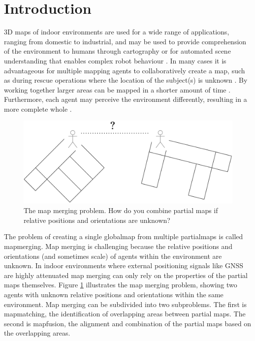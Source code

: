 
\section{Introduction}

3D \gls{map}s of indoor environments are used for a wide range of applications, ranging from domestic to industrial, and may be used to provide comprehension of the environment to humans through cartography or for automated scene understanding that enables complex robot behaviour \citep{chen_indoor_2020,wang_safe_2019,hermann_design_2016}. In many cases it is advantageous for multiple mapping agents to collaboratively create a map, such as during rescue operations where the location of the subject(s) is unknown \citep{queralta_collaborative_2020}. By working together larger areas can be mapped in a shorter amount of time \citep{lajoie_towards_2022}. Furthermore, each agent may perceive the environment differently, resulting in a more complete whole \citep{schuster_arches_2020}.

\begin{figure}[h]
    \centering
    \includegraphics*[width=.7\textwidth]{./fig/overview_diagrams-Page-4.drawio.pdf}
    \caption{The map merging problem. How do you combine partial maps if relative positions and orientations are unknown?}
    \label{fig:map_merging}
\end{figure}

The problem of creating a single \gls{globalmap} from multiple \gls{partialmap}s is called \gls{mapmerging}. Map merging is challenging because the relative positions and orientations (and sometimes scale) of agents within the environment are unknown. In indoor environments where external positioning signals like GNSS are highly attenuated map merging can only rely on the properties of the partial maps themselves. Figure \ref{fig:map_merging} illustrates the map merging problem, showing two agents with unknown relative positions and orientations within the same environment. Map merging can be subdivided into two subproblems. The first is \gls{mapmatching}, the identification of overlapping areas between partial maps. The second is \gls{mapfusion}, the alignment and combination of the partial maps based on the overlapping areas. 

